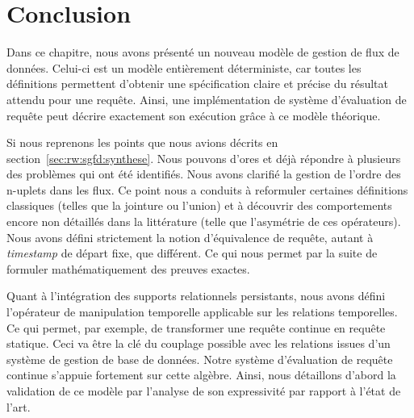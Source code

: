 \section{Conclusion}\label{sec:contrib:astral:conclusion}
Dans ce chapitre, nous avons présenté un nouveau modèle de gestion de flux de données. Celui-ci est un modèle entièrement déterministe, car toutes les définitions permettent d'obtenir une spécification claire et précise du résultat attendu pour une requête. Ainsi, une implémentation de système d'évaluation de requête peut décrire exactement son exécution grâce à ce modèle théorique.

Si nous reprenons les points que nous avions décrits en section~\ref{sec:rw:sgfd:synthese}. Nous pouvons d'ores et déjà répondre à plusieurs des problèmes qui ont été identifiés. Nous avons clarifié la gestion de l'ordre des n-uplets dans les flux. Ce point nous a conduits à reformuler certaines définitions classiques (telles que la jointure ou l'union) et à découvrir des comportements encore non détaillés dans la littérature (telle que l'asymétrie de ces opérateurs). Nous avons défini strictement la notion d'équivalence de requête, autant à \textit{timestamp} de départ fixe, que différent. Ce qui nous permet par la suite de formuler mathématiquement des preuves exactes.

Quant à l'intégration des supports relationnels persistants, nous avons défini l'opérateur de manipulation temporelle applicable sur les relations temporelles. Ce qui permet, par exemple, de transformer une requête continue en requête statique. Ceci va être la clé du couplage possible avec les relations issues d'un système de gestion de base de données. Notre système d'évaluation de requête continue s'appuie fortement sur cette algèbre. Ainsi, nous détaillons d'abord la validation de ce modèle par l'analyse de son expressivité par rapport à l'état de l'art.
